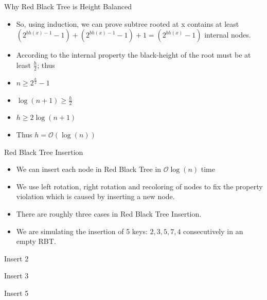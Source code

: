 \documentclass{beamer}
\begin{document}
\begin{frame}{Why Red Black Tree is Height Balanced}

\begin{itemize}
    \item So, using induction, we can prove subtree rooted at x contains at least $(2^{bh(x)-1}-1) + (2^{bh(x)-1}-1) + 1 = (2^{bh(x)} -1)$ internal nodes.
    \item According to the internal property the black-height of the root must be at least $\frac{h}{2}$; thus
    \item  $n \geqslant 2^{\frac{h}{2}}-1$
	\item  $\log(n+1) \geqslant \frac{h}{2}$
	\item $h \geqslant 2\log(n+1)$	
	\item Thus $h = \mathcal{O}(\log(n))$
\end{itemize}


\end{frame}

\begin{frame}{Red Black Tree Insertion}
\begin{itemize}
    \item<1-> We can insert each node in Red Black Tree in $\mathcal{O}\log(n)$ time
    \item<2-> We use left rotation, right rotation and recoloring of nodes to fix the property violation which is caused by inserting a new node.
    \item<3-> There are roughly three cases in Red Black Tree Insertion.
    \item<4-> We are simulating the insertion of 5 keys: ${2,3,5,7,4}$ consecutively in an empty RBT.
    
\end{itemize}
    
\end{frame}

\begin{frame}{Insert 2}
\centering

\end{frame}

\begin{frame}{Insert 3}
\centering

\end{frame}

\begin{frame}{Insert 5}
\centering

\end{frame}
\end{document}
